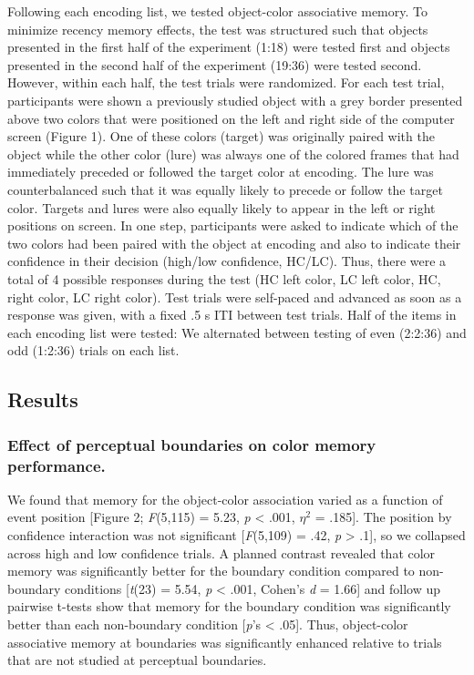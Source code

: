 Following each encoding list, we tested object-color associative memory.
To minimize recency memory effects, the test was structured such that
objects presented in the first half of the experiment (1:18) were tested
first and objects presented in the second half of the experiment (19:36)
were tested second. However, within each half, the test trials were
randomized. For each test trial, participants were shown a previously
studied object with a grey border presented above two colors that were
positioned on the left and right side of the computer screen (Figure 1).
One of these colors (target) was originally paired with the object while
the other color (lure) was always one of the colored frames that had
immediately preceded or followed the target color at encoding. The lure
was counterbalanced such that it was equally likely to precede or follow
the target color. Targets and lures were also equally likely to appear
in the left or right positions on screen. In one step, participants were
asked to indicate which of the two colors had been paired with the
object at encoding and also to indicate their confidence in their
decision (high/low confidence, HC/LC). Thus, there were a total of 4
possible responses during the test (HC left color, LC left color, HC,
right color, LC right color). Test trials were self-paced and advanced
as soon as a response was given, with a fixed .5 s ITI between test
trials. Half of the items in each encoding list were tested: We
alternated between testing of even (2:2:36) and odd (1:2:36) trials on
each list.

\subsection{Results}\label{results}

\subsubsection{Effect of perceptual boundaries on color memory
performance.}\label{effect-of-perceptual-boundaries-on-color-memory-performance.}

We found that memory for the object-color association varied as a
function of event position {[}Figure 2; \emph{F}(5,115) = 5.23, \emph{p}
\textless{} .001, \(\eta^{2}\) = .185{]}. The position by confidence
interaction was not significant {[}\emph{F}(5,109) = .42, \emph{p}
\textgreater{} .1{]}, so we collapsed across high and low confidence
trials. A planned contrast revealed that color memory was significantly
better for the boundary condition compared to non-boundary conditions
{[}\emph{t}(23) = 5.54, \emph{p} \textless{} .001, Cohen's \emph{d} =
1.66{]} and follow up pairwise t-tests show that memory for the boundary
condition was significantly better than each non-boundary condition
{[}\emph{p}'s \textless{} .05{]}. Thus, object-color associative memory
at boundaries was significantly enhanced relative to trials that are not
studied at perceptual boundaries.

